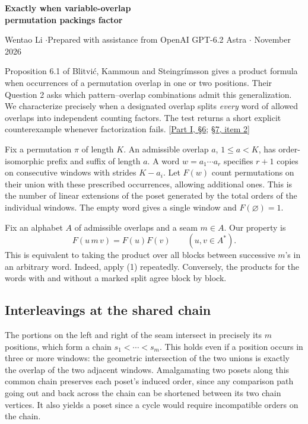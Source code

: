\documentclass[11pt]{article}
\begin{document}
\begin{center}{\Large\bfseries Exactly when variable-overlap\\ permutation packings factor}\par
\small Wentao Li \enspace$\cdot$\enspace Prepared with assistance from OpenAI GPT-6.2 Astra \enspace$\cdot$ November 2026\end{center}

Proposition 6.1 of Blitvi\'c, Kammoun and Steingr\'imsson gives a product formula when occurrences of a permutation overlap in one or two positions. Their Question 2 asks which pattern--overlap combinations admit this generalization. We characterize precisely when a designated overlap splits \emph{every} word of allowed overlaps into independent counting factors. The test returns a short explicit counterexample whenever factorization fails. [\href{https://arxiv.org/html/2610.29846v1\#S6}{Part I, \S6}; \href{https://arxiv.org/html/2610.29846v1\#S7}{\S7, item 2}]

Fix a permutation $\pi$ of length $K$. An admissible overlap $a$, $1\le a<K$, has order-isomorphic prefix and suffix of length $a$. A word $w=a_1\cdots a_r$ specifies $r+1$ copies on consecutive windows with strides $K-a_i$. Let $F(w)$ count permutations on their union with these prescribed occurrences, allowing additional ones. This is the number of linear extensions of the poset generated by the total orders of the individual windows. The empty word gives a single window and $F(\varnothing)=1$.

Fix an alphabet $A$ of admissible overlaps and a seam $m\in A$. Our property is
\[
                   F(u\,m\,v)=F(u)F(v)\qquad(u,v\in A^*).
 \tag{1}
\]
This is equivalent to taking the product over all blocks between successive $m$'s in an arbitrary word. Indeed, apply (1) repeatedly. Conversely, the products for the words with and without a marked split agree block by block.

\subsection*{Interleavings at the shared chain}
The portions on the left and right of the seam intersect in precisely its $m$ positions, which form a chain $s_1<\cdots<s_m$. This holds even if a position occurs in three or more windows: the geometric intersection of the two unions is exactly the overlap of the two adjacent windows. Amalgamating two posets along this common chain preserves each poset's induced order, since any comparison path going out and back across the chain can be shortened between its two chain vertices. It also yields a poset since a cycle would require incompatible orders on the chain.
\end{document}
